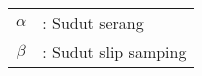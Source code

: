 \renewcommand{\arraystretch}{1.4}
\begin{tabular}{c l}
        $\alpha$ &: Sudut serang   \\
        $\beta$ &: Sudut slip samping    
\end{tabular}